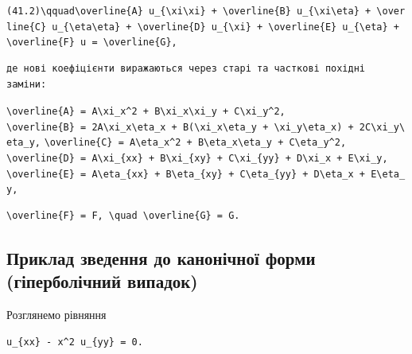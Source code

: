 \documentclass[
  ukrainian,
]{article}
\begin{document}
\texttt{(41.2)\textbackslash{}qquad\textbackslash{}overline\{A\}\ u\_\{\textbackslash{}xi\textbackslash{}xi\}\ +\ \textbackslash{}overline\{B\}\ u\_\{\textbackslash{}xi\textbackslash{}eta\}\ +\ \textbackslash{}overline\{C\}\ u\_\{\textbackslash{}eta\textbackslash{}eta\}\ +\ \textbackslash{}overline\{D\}\ u\_\{\textbackslash{}xi\}\ +\ \textbackslash{}overline\{E\}\ u\_\{\textbackslash{}eta\}\ +\ \textbackslash{}overline\{F\}\ u\ =\ \textbackslash{}overline\{G\},}

\begin{verbatim}
де нові коефіцієнти виражаються через старі та часткові похідні заміни:
\end{verbatim}

\texttt{\textbackslash{}overline\{A\}\ =\ A\textbackslash{}xi\_x\^{}2\ +\ B\textbackslash{}xi\_x\textbackslash{}xi\_y\ +\ C\textbackslash{}xi\_y\^{}2,}
\texttt{\textbackslash{}overline\{B\}\ =\ 2A\textbackslash{}xi\_x\textbackslash{}eta\_x\ +\ B(\textbackslash{}xi\_x\textbackslash{}eta\_y\ +\ \textbackslash{}xi\_y\textbackslash{}eta\_x)\ +\ 2C\textbackslash{}xi\_y\textbackslash{}eta\_y,}
\texttt{\textbackslash{}overline\{C\}\ =\ A\textbackslash{}eta\_x\^{}2\ +\ B\textbackslash{}eta\_x\textbackslash{}eta\_y\ +\ C\textbackslash{}eta\_y\^{}2,}
\texttt{\textbackslash{}overline\{D\}\ =\ A\textbackslash{}xi\_\{xx\}\ +\ B\textbackslash{}xi\_\{xy\}\ +\ C\textbackslash{}xi\_\{yy\}\ +\ D\textbackslash{}xi\_x\ +\ E\textbackslash{}xi\_y,}
\texttt{\textbackslash{}overline\{E\}\ =\ A\textbackslash{}eta\_\{xx\}\ +\ B\textbackslash{}eta\_\{xy\}\ +\ C\textbackslash{}eta\_\{yy\}\ +\ D\textbackslash{}eta\_x\ +\ E\textbackslash{}eta\_y,}

\begin{verbatim}
\overline{F} = F, \quad \overline{G} = G.
\end{verbatim}

\subsection{Приклад зведення до канонічної форми (гіперболічний
випадок)}\label{ux43fux440ux438ux43aux43bux430ux434-ux437ux432ux435ux434ux435ux43dux43dux44f-ux434ux43e-ux43aux430ux43dux43eux43dux456ux447ux43dux43eux457-ux444ux43eux440ux43cux438-ux433ux456ux43fux435ux440ux431ux43eux43bux456ux447ux43dux438ux439-ux432ux438ux43fux430ux434ux43eux43a}

Розглянемо рівняння

\begin{verbatim}
u_{xx} - x^2 u_{yy} = 0.
\end{verbatim}
\end{document}
